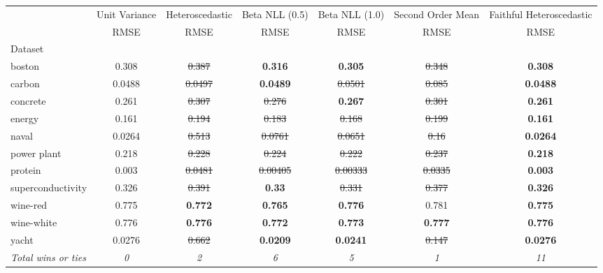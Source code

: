 \begin{tabular}{l|c|c|c|c|c|c}
\toprule
{} & {Unit Variance} & {Heteroscedastic} & {Beta NLL (0.5)} & {Beta NLL (1.0)} & {Second Order Mean} & {Faithful Heteroscedastic} \\
{} & {RMSE} & {RMSE} & {RMSE} & {RMSE} & {RMSE} & {RMSE} \\
{Dataset} & {} & {} & {} & {} & {} & {} \\
\midrule
boston & 0.308 & \sout{0.387} & \textbf{0.316} & \textbf{0.305} & \sout{0.348} & \textbf{0.308} \\
carbon & 0.0488 & \sout{0.0497} & \textbf{0.0489} & \sout{0.0501} & \sout{0.085} & \textbf{0.0488} \\
concrete & 0.261 & \sout{0.307} & \sout{0.276} & \textbf{0.267} & \sout{0.301} & \textbf{0.261} \\
energy & 0.161 & \sout{0.194} & \sout{0.183} & \sout{0.168} & \sout{0.199} & \textbf{0.161} \\
naval & 0.0264 & \sout{0.513} & \sout{0.0761} & \sout{0.0651} & \sout{0.16} & \textbf{0.0264} \\
power plant & 0.218 & \sout{0.228} & \sout{0.224} & \sout{0.222} & \sout{0.237} & \textbf{0.218} \\
protein & 0.003 & \sout{0.0481} & \sout{0.00405} & \sout{0.00333} & \sout{0.0335} & \textbf{0.003} \\
superconductivity & 0.326 & \sout{0.391} & \textbf{0.33} & \sout{0.331} & \sout{0.377} & \textbf{0.326} \\
wine-red & 0.775 & \textbf{0.772} & \textbf{0.765} & \textbf{0.776} & 0.781 & \textbf{0.775} \\
wine-white & 0.776 & \textbf{0.776} & \textbf{0.772} & \textbf{0.773} & \textbf{0.777} & \textbf{0.776} \\
yacht & 0.0276 & \sout{0.662} & \textbf{0.0209} & \textbf{0.0241} & \sout{0.147} & \textbf{0.0276} \\
\textit{{Total wins or ties}} & \textit{0} & \textit{2} & \textit{6} & \textit{5} & \textit{1} & \textit{11} \\
\bottomrule
\end{tabular}
